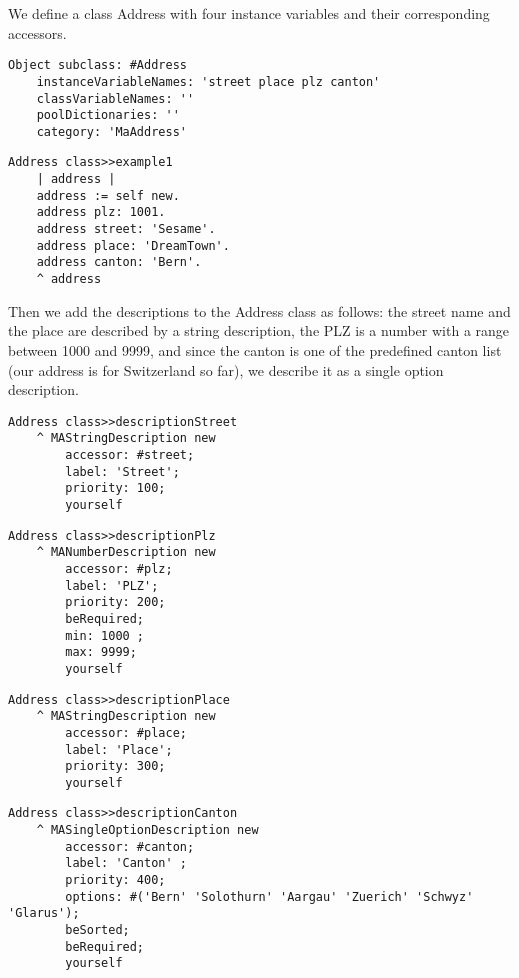 \documentclass[a4paper,10pt,twoside]{book}
\newcommand{\ct}[1]{{\small\ttfamily\textup{#1}}}
\begin{document}
We define a class \ct{Address} with four instance variables and their corresponding accessors. 

\begin{lstlisting}
Object subclass: #Address
    instanceVariableNames: 'street place plz canton'
    classVariableNames: ''
    poolDictionaries: ''
    category: 'MaAddress'
\end{lstlisting}

\begin{lstlisting}
Address class>>example1
    | address | 
    address := self new.
    address plz: 1001.
    address street: 'Sesame'.
    address place: 'DreamTown'.
    address canton: 'Bern'.
    ^ address
\end{lstlisting}

Then we add the descriptions to the \ct{Address} class as follows: the street name and the place are described by a string description, the PLZ is a number with a range between 1000 and 9999, and since the canton is one of the predefined canton list (our address is for Switzerland so far), we describe it as a single option description.

\begin{lstlisting}
Address class>>descriptionStreet
    ^ MAStringDescription new 
        accessor: #street;
        label: 'Street';
        priority: 100; 
        yourself
\end{lstlisting}

\begin{lstlisting}
Address class>>descriptionPlz
    ^ MANumberDescription new 
        accessor: #plz;
        label: 'PLZ';
        priority: 200; 
        beRequired;
        min: 1000 ; 
        max: 9999;
        yourself
\end{lstlisting}

\begin{lstlisting}
Address class>>descriptionPlace
    ^ MAStringDescription new
        accessor: #place;
        label: 'Place'; 
        priority: 300; 
        yourself
\end{lstlisting}

\begin{lstlisting}
Address class>>descriptionCanton
    ^ MASingleOptionDescription new
        accessor: #canton;
        label: 'Canton' ; 
        priority: 400;
        options: #('Bern' 'Solothurn' 'Aargau' 'Zuerich' 'Schwyz' 'Glarus');
        beSorted;
        beRequired; 
        yourself
\end{lstlisting}
\end{document}

